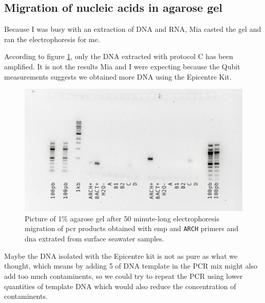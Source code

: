 \subsection{Migration of nucleic acids in agarose gel}
\label{task:20180201_cj3}

Because I was busy with an extraction of DNA and RNA, Mia casted the gel and ran the electrophoresis for me. 

According to figure \ref{fig:20180201_OneTaq_EMP_ARCH}, only the DNA extracted with protocol C has been amplified. It is not the results Mia and I were expecting because the Qubit measurements suggests we obtained more DNA using the Epicentre Kit. 

\begin{figure}[H] 
    \centering
    \caption{Picture of 1\% agarose gel after 50 minute-long electrophoresis migration of \gls{pcr} products obtained with \gls{emp} and \texttt{ARCH} primers and \gls{dna} extrated from surface seawater samples.}
    \label{fig:20180201_OneTaq_EMP_ARCH}
    \includegraphics[width=\textwidth]{graphics/pic/20180201_OneTaq_EMP_ARCH.png}
\end{figure}

Maybe the DNA isolated with the Epicentre kit is not as pure as what we thought, which means by adding 5 \uL of DNA template in the PCR mix might also add too much contaminents, so we could try to repeat the PCR using lower quantities of template DNA which would also reduce the concentration of contaminents. 


